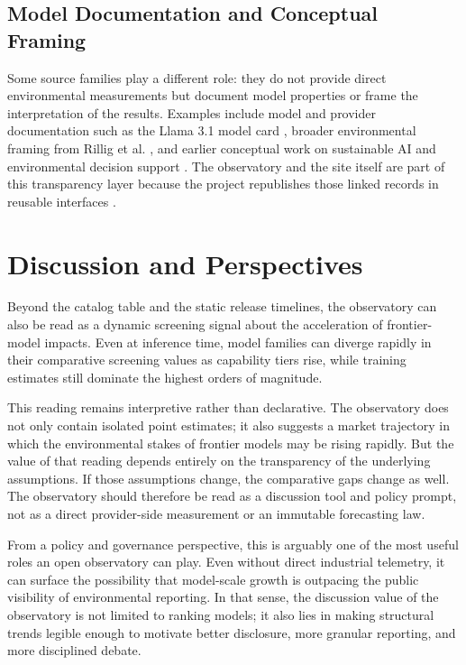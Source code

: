 \documentclass[runningheads]{llncs}
\begin{document}
\subsection{Model Documentation and Conceptual Framing}
Some source families play a different role: they do not provide direct environmental measurements but document model properties or frame the interpretation of the results. Examples include model and provider documentation such as the Llama 3.1 model card \cite{meta2024llama}, broader environmental framing from Rillig et al. \cite{rillig2023}, and earlier conceptual work on sustainable AI and environmental decision support \cite{pachot2023sustainableai}. The observatory and the site itself are part of this transparency layer because the project republishes those linked records in reusable interfaces \cite{impactllmrepo2026}.

\section{Discussion and Perspectives}
Beyond the catalog table and the static release timelines, the observatory can also be read as a dynamic screening signal about the acceleration of frontier-model impacts. Even at inference time, model families can diverge rapidly in their comparative screening values as capability tiers rise, while training estimates still dominate the highest orders of magnitude.

This reading remains interpretive rather than declarative. The observatory does not only contain isolated point estimates; it also suggests a market trajectory in which the environmental stakes of frontier models may be rising rapidly. But the value of that reading depends entirely on the transparency of the underlying assumptions. If those assumptions change, the comparative gaps change as well. The observatory should therefore be read as a discussion tool and policy prompt, not as a direct provider-side measurement or an immutable forecasting law.

From a policy and governance perspective, this is arguably one of the most useful roles an open observatory can play. Even without direct industrial telemetry, it can surface the possibility that model-scale growth is outpacing the public visibility of environmental reporting. In that sense, the discussion value of the observatory is not limited to ranking models; it also lies in making structural trends legible enough to motivate better disclosure, more granular reporting, and more disciplined debate.
\end{document}
